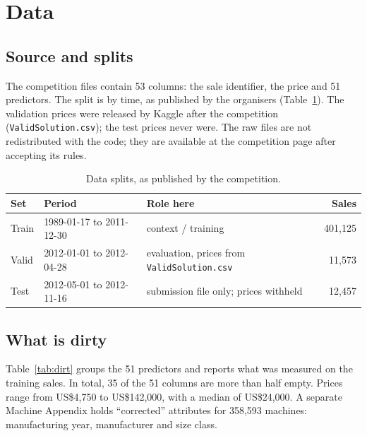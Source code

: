 \documentclass[11pt,a4paper]{article}
\begin{document}
\section{Data}

\subsection{Source and splits}

The competition files contain 53 columns: the sale identifier, the price and 51 predictors. The split is by time, as published by the organisers (Table~\ref{tab:splits}). The validation prices were released by Kaggle after the competition (\texttt{ValidSolution.csv}); the test prices never were. The raw files are not redistributed with the code; they are available at the competition page after accepting its rules.

\begin{table}[H]
\centering\small
\caption{Data splits, as published by the competition.}
\label{tab:splits}
\begin{tabular}{lllr}
\toprule
Set & Period & Role here & Sales \\
\midrule
Train & 1989-01-17 to 2011-12-30 & context / training & 401,125 \\
Valid & 2012-01-01 to 2012-04-28 & evaluation, prices from \texttt{ValidSolution.csv} & 11,573 \\
Test & 2012-05-01 to 2012-11-16 & submission file only; prices withheld & 12,457 \\
\bottomrule
\end{tabular}
\end{table}

\subsection{What is dirty}

Table~\ref{tab:dirt} groups the 51 predictors and reports what was measured on the training sales. In total, 35 of the 51 columns are more than half empty. Prices range from US\$4,750 to US\$142,000, with a median of US\$24,000. A separate Machine Appendix holds ``corrected'' attributes for 358,593 machines: manufacturing year, manufacturer and size class.
\end{document}
